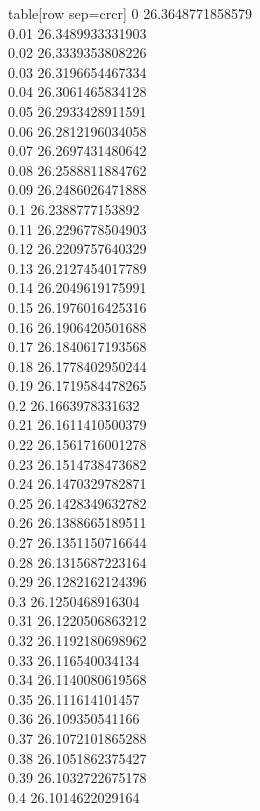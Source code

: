   table[row sep=crcr]{%
0	26.3648771858579\\
0.01	26.3489933331903\\
0.02	26.3339353808226\\
0.03	26.3196654467334\\
0.04	26.3061465834128\\
0.05	26.2933428911591\\
0.06	26.2812196034058\\
0.07	26.2697431480642\\
0.08	26.2588811884762\\
0.09	26.2486026471888\\
0.1	26.2388777153892\\
0.11	26.2296778504903\\
0.12	26.2209757640329\\
0.13	26.2127454017789\\
0.14	26.2049619175991\\
0.15	26.1976016425316\\
0.16	26.1906420501688\\
0.17	26.1840617193568\\
0.18	26.1778402950244\\
0.19	26.1719584478265\\
0.2	26.1663978331632\\
0.21	26.1611410500379\\
0.22	26.1561716001278\\
0.23	26.1514738473682\\
0.24	26.1470329782871\\
0.25	26.1428349632782\\
0.26	26.1388665189511\\
0.27	26.1351150716644\\
0.28	26.1315687223164\\
0.29	26.1282162124396\\
0.3	26.1250468916304\\
0.31	26.1220506863212\\
0.32	26.1192180698962\\
0.33	26.116540034134\\
0.34	26.1140080619568\\
0.35	26.111614101457\\
0.36	26.109350541166\\
0.37	26.1072101865288\\
0.38	26.1051862375427\\
0.39	26.1032722675178\\
0.4	26.1014622029164\\
}

